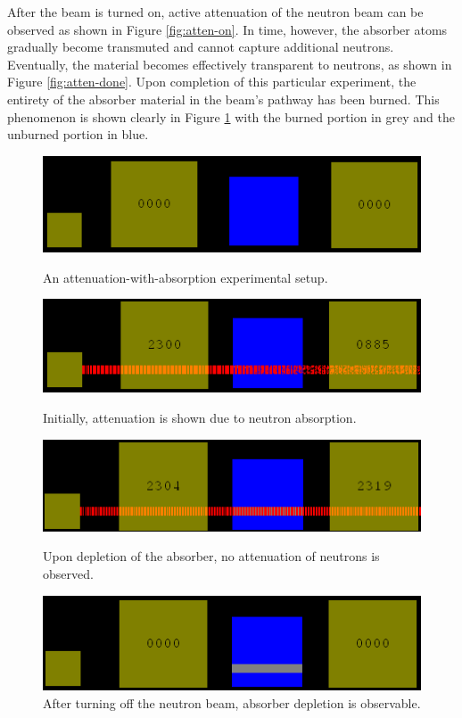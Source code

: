 \documentclass{anstrans}
\begin{document}
After the beam is turned on, active attenuation of the neutron beam can be
observed as shown in Figure \ref{fig:atten-on}. In time, however, the absorber
atoms gradually become transmuted and cannot capture additional neutrons.
Eventually, the material becomes effectively transparent to neutrons, as shown
in Figure \ref{fig:atten-done}. Upon completion of this particular experiment,
the entirety of the absorber material in the beam's pathway has been burned.
This phenomenon is shown clearly in Figure \ref{fig:atten-off} with the burned
portion in grey and the unburned portion in blue.

\begin{figure}[hb]
    \centering
    \includegraphics[width=\columnwidth]{atten-setup.png}
    \caption{An attenuation-with-absorption experimental setup.}
    \label{fig:atten-setup}
    \centering
    \includegraphics[width=\columnwidth]{atten-on.png}
    \caption{Initially, attenuation is shown due to neutron absorption.}
    \label{fig:atten-on}
    \centering
    \includegraphics[width=\columnwidth]{atten-done.png}
    \caption{Upon depletion of the absorber, no attenuation of neutrons is observed.}
    \label{fig:atten-done}
    \centering
    \includegraphics[width=\columnwidth]{atten-off.png}
    \caption{After turning off the neutron beam, absorber depletion is observable.}
    \label{fig:atten-off}
\end{figure}
\end{document}
